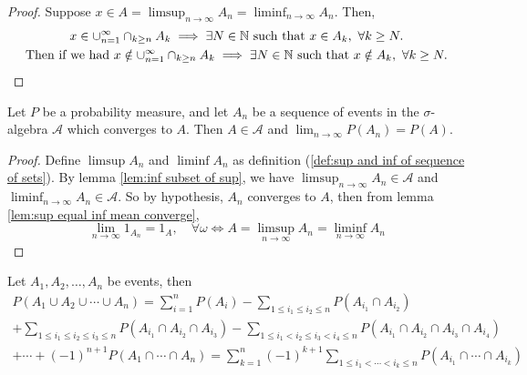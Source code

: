 \documentclass[../main.tex]{subfiles}
\begin{document}
\begin{proof}
Suppose $ x \in A = \limsup_{n\to\infty}{A_n} = \liminf_{n\to\infty}{A_n}$. Then,
\begin{gather*}
x \in \cup^\infty_{n=1}\cap_{k\geq n}{A_k} \implies \exists N \in \mathbb{N} \textnormal{ such that } x \in A_k, \ \forall k \geq N. \\
\textnormal{Then if we had } x \notin \cup^\infty_{n=1}\cap_{k\geq n}{A_k} \implies \exists N \in \mathbb{N} \textnormal{ such that } x \notin A_k, \ \forall k \geq N.
\end{gather*}
\end{proof}





\begin{theorem}
    Let $P$ be a probability measure, and let $A_n$ be a sequence of events in the $\sigma$-algebra $\mathcal{A}$
    which converges to $A$. Then $A \in \mathcal{A}$ and $\lim_{n\to\infty}{P(A_n)} = P(A)$.
    \end{theorem}
    
\begin{proof}
    Define $\limsup{A_n}$ and $\liminf{A_n}$ as definition (\ref{def:sup and inf of sequence of sets}). 
    By lemma \ref{lem:inf subset of sup}, we have $\limsup_{n\to\infty}{A_n}\in \mathcal{A}$
    and $\liminf_{n\to\infty}{A_n}\in \mathcal{A}$. So by hypothesis, 
    $A_n$ converges to $A$, then from lemma \ref{lem:sup equal inf mean converge}, \[
    \lim_{n\to\infty}{1_{A_n}} = 1_A, \quad \forall \omega \iff A = \limsup_{n \to \infty}{A_n} = \liminf_{n \to \infty}{A_n} 
    \]
\end{proof}

\begin{theorem}
Let \(A_1, A_2, \dots, A_n\) be events, then
\begin{gather*} P(A_1 \cup A_2 \cup \cdots \cup A_n) = \sum_{i=1}^{n}{P(A_i)} - \sum_{1 \leq i_1 \leq i_2 \leq n}{P(A_{i_1} \cap A_{i_2})}\\ + \sum_{1 \leq i_1 \leq i_2 \leq i_3 \leq n}{P(A_{i_1} \cap A_{i_2} \cap A_{i_3})} - \sum_{1 \leq i_1 < i_2 \leq i_3 < i_4 \leq n}{P(A_{i_1} \cap A_{i_2} \cap A_{i_3} \cap A_{i_4})} \\ + \cdots + (-1)^{n+1}P(A_1 \cap \cdots \cap A_n)  = \sum_{k=1}^{n}(-1)^{k+1} \sum_{1 \leq i_1 < \cdots < i_k \leq n}{P(A_{i_1} \cap \cdots \cap A_{i_k})} 
\end{gather*}


\end{theorem}
\end{document}
